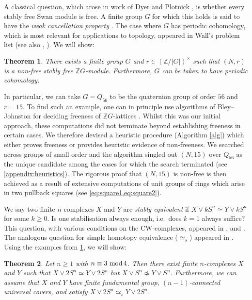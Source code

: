 \documentclass[11pt,leqno,a4paper]{amsart}
\newcommand{\Z}{\mathbb{Z}}
\renewcommand{\mod}{\,\,\text{\normalfont mod}\,}
\newtheorem{thmx}{Theorem}
\theoremstyle{definition}
\theoremstyle{remark}
\theoremstyle{custom}
\begin{document}
A classical question, which arose in work of Dyer \cite[Note (c) p276]{Dy76} and Plotnick \cite[p98]{Pl82}, is whether every stably free Swan module is free.
A finite group $G$ for which this holds is said to have the \textit{weak cancellation property} \cite[p582]{Jo04}.
The case where $G$ has periodic cohomology, which is most relevant for applications to topology, appeared in Wall's problem list \cite[Problem A4]{Wa79} (see also \cite[Section 2]{Jo04}, \cite[Question 7.2]{Ni20a}).
We will show:

\begin{thmx} \label{thmx:SF-vs-F}
There exists a finite group $G$ and $r \in (\Z/|G|)^\times$ such that $(N, r)$ is a non-free stably free $\Z G$-module. Furthermore, $G$ can be taken to have periodic cohomology.
\end{thmx}

In particular, we can take $G = Q_{56}$ to be the quaternion group of order $56$ and $r=15$.
To find such an example, one can in principle use algorithms of Bley--Johnston for deciding freeness of $\Z G$-lattices \cite{MR2422318,MR2813368}. Whilst this was our initial approach, these computations did not terminate beyond establishing freeness in certain cases. We therefore devised a heuristic procedure (Algorithm \ref{alg}) which either proves freeness or provides heuristic evidence of non-freeness.
We searched across groups of small order and the algorithm singled out $(N,15)$ over $Q_{56}$ as the unique candidate among the cases for which the search terminated (see \cref{appendix:heuristics}). The rigorous proof
that $(N,15)$ is non-free is then achieved as a result of extensive computations of unit groups of rings which arise in two pullback squares (see \cref{eq:square1,eq:square2}).

We say two finite $n$-complexes $X$ and $Y$ are \textit{stably equivalent} if $X \vee kS^n \simeq Y \vee kS^n$ for some $k \ge 0$. Is one stabilisation always enough, i.e.~does $k=1$ always suffice? This question, with various conditions on the CW-complexes, appeared in \cite[Problem (c)]{Dy79a}, \cite[p124]{HMS93} and \cite[Problem B2]{Ni21b}.
The analogous question for simple homotopy equivalence ($\simeq_s$) appeared in \cite[Question 1]{Dy81}.
Using the examples from \cref{thmx:SF-vs-F}, we will show:

\begin{thmx} \label{thmx:CW}
Let $n \ge 1$ with $n \equiv 3 \mod 4$.
Then there exist finite $n$-complexes $X$ and $Y$ such that $X \vee 2S^n \simeq Y \vee 2S^n$ but $X \vee S^n \not \simeq Y \vee S^n$.
Furthermore, we can assume that $X$ and $Y$ have finite fundamental group, $(n-1)$-connected universal covers, and satisfy $X \vee 2S^n \simeq_s Y \vee 2S^n$.
\end{thmx}
\end{document}
